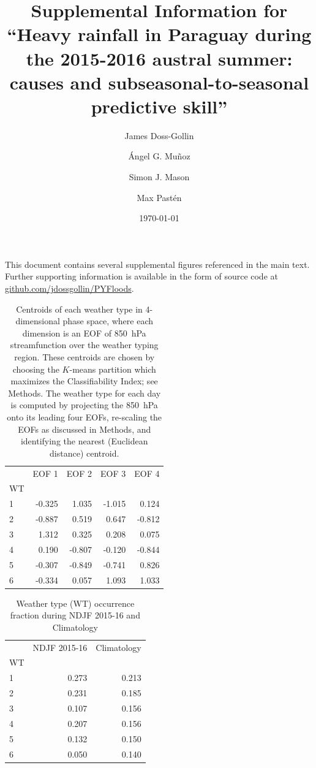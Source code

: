 \documentclass{article}
\title{Supplemental Information for\\``Heavy rainfall in Paraguay during the 2015-2016 austral summer: causes and subseasonal-to-seasonal predictive skill''}
\author{James Doss-Gollin\and \'{A}ngel G. Mu\~{n}oz  \and Simon J. Mason \and Max Past\'{e}n }
\date{\today}
\begin{document}
\maketitle

This document contains several supplemental figures referenced in the main text.
Further supporting information is available in the form of source code at \url{github.com/jdossgollin/PYFloods}.

\listoftables
\listoffigures

\clearpage

\begin{table}
	\centering
	\begin{tabular}{lrrrr}
		\toprule
		{} &  EOF 1 &  EOF 2 &  EOF 3 &  EOF 4 \\
		WT &        &        &        &        \\
		\midrule
		1  & -0.325 &  1.035 & -1.015 &  0.124 \\
		2  & -0.887 &  0.519 &  0.647 & -0.812 \\
		3  &  1.312 &  0.325 &  0.208 &  0.075 \\
		4  &  0.190 & -0.807 & -0.120 & -0.844 \\
		5  & -0.307 & -0.849 & -0.741 &  0.826 \\
		6  & -0.334 &  0.057 &  1.093 &  1.033 \\
		\bottomrule
		\end{tabular}
	\caption{
		Centroids of each weather type in 4-dimensional phase space, where each dimension is an EOF of \SI{850}{\hecto\pascal} streamfunction over the weather typing region.
		These centroids are chosen by choosing the $K$-means partition which maximizes the Classifiability Index; see Methods.
		The weather type for each day is computed by projecting the \SI{850}{\hecto\pascal} onto its leading four EOFs, re-scaling the EOFs as discussed in Methods, and identifying the nearest (Euclidean distance) centroid.
	}
\end{table}

\begin{table}
	\centering
	\begin{tabular}{lrr}
		\toprule
		{} &  NDJF 2015-16 &  Climatology \\
		WT &               &              \\
		\midrule
		1     &         0.273 &        0.213 \\
		2     &         0.231 &        0.185 \\
		3     &         0.107 &        0.156 \\
		4     &         0.207 &        0.156 \\
		5     &         0.132 &        0.150 \\
		6     &         0.050 &        0.140 \\
		\bottomrule
	\end{tabular}
	\caption{Weather type (WT) occurrence fraction during NDJF 2015-16 and Climatology}
\end{table}
\end{document}
